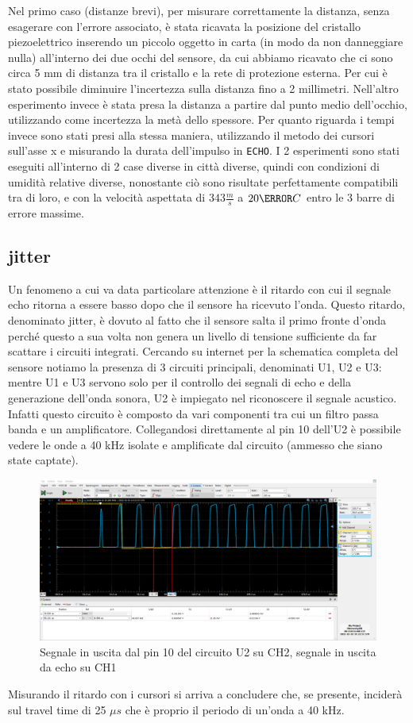 \documentclass[10pt, a4paper, italian]{article}
\begin{document}
Nel primo caso (distanze brevi), per misurare correttamente la distanza, senza esagerare con l'errore associato, è stata ricavata la posizione del cristallo piezoelettrico inserendo un piccolo oggetto in carta (in modo da non danneggiare nulla) all'interno dei due occhi del sensore, da cui abbiamo ricavato che ci sono circa 5 mm di distanza tra il cristallo e la rete di protezione esterna. Per cui è stato possibile diminuire l'incertezza sulla distanza fino a 2 millimetri. Nell'altro esperimento invece è stata presa la distanza a partire dal punto medio dell'occhio, utilizzando come incertezza la metà dello spessore. Per quanto riguarda i tempi invece sono stati presi alla stessa maniera, utilizzando il metodo dei cursori sull'asse x e misurando la durata dell'impulso in \verb+ECHO+. I 2 esperimenti sono stati eseguiti all'interno di 2 case diverse in città diverse, quindi con condizioni di umidità relative diverse, nonostante ciò sono risultate perfettamente compatibili tra di loro, e con la velocità aspettata di $343 \frac{m}{s}$ a $20 \degree C$ entro le 3 barre di errore massime.
\subsection{jitter}
Un fenomeno a cui va data particolare attenzione è il ritardo con cui il segnale echo ritorna a essere basso dopo che il sensore ha ricevuto l'onda. Questo ritardo, denominato jitter, è dovuto al fatto che il sensore salta il primo fronte d'onda perché questo a sua volta non genera un livello di tensione sufficiente da far scattare i circuiti integrati. Cercando su internet per la schematica completa del sensore notiamo la presenza di 3 circuiti principali, denominati U1, U2 e U3: mentre U1 e U3 servono solo per il controllo dei segnali di echo e della generazione dell'onda sonora, U2 è impiegato nel riconoscere il segnale acustico.
Infatti questo circuito è composto da vari componenti tra cui un filtro passa banda e un amplificatore. Collegandosi direttamente al pin 10 dell'U2 è possibile vedere le onde a 40 kHz isolate e amplificate dal circuito (ammesso che siano state captate).
\begin{figure}[H]
    \centering
	\includegraphics[scale=0.4]{jitter2}
    \caption{Segnale in uscita dal pin 10 del circuito U2 su CH2, segnale in uscita da echo su CH1}
\end{figure}
Misurando il ritardo con i cursori si arriva a concludere che, se presente, inciderà sul travel time di 25 $\mu s$ che è proprio il periodo di un'onda a 40 kHz.
\end{document}
